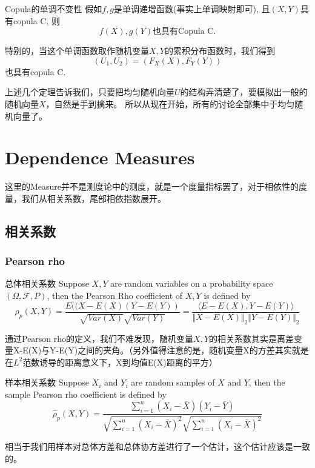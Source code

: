\documentclass[12pt]{article}
\theoremstyle{definition}
\newcommand{\inner}[2]{{\langle #1,#2\rangle}}
\newcommand{\Sum}[2]{{\sum_{#1}^{#2}}}
\begin{document}
\begin{stheorem}{Copula的单调不变性}{}
假如$f,g$是单调递增函数(事实上单调映射即可), 且$(X,Y)$具有copula C, 则
$$
f(X), g(Y) \text{也具有Copula C}.
$$
\end{stheorem}
\begin{sremark}{}{}
特别的，当这个单调函数取作随机变量$X,Y$的累积分布函数时，我们得到
$$
(U_1,U_2) = (F_X(X),F_Y(Y))
$$
也具有copula C.
\end{sremark}
上述几个定理告诉我们，只要把均匀随机向量$U$的结构弄清楚了，要模拟出一般的随机向量$X$，自然是手到擒来。
所以从现在开始，所有的讨论全部集中于均匀随机向量了。



\section{Dependence Measures}
这里的Measure并不是测度论中的测度，就是一个度量指标罢了，对于相依性的度量，我们从相关系数，尾部相依指数展开。
\subsection{相关系数}
\subsubsection{Pearson rho}
\begin{sdefinition}{总体相关系数}{}
Suppose $X,Y$ are random variables on a probability space $(\Omega,\mathcal{F},P)$, then the Pearson Rho coefficient of $X,Y$ is defined by 
$$
\rho_p(X,Y) = \frac{E((X-E(X)(Y-E(Y))}{\sqrt{Var(X)}\sqrt{Var(Y)}} = \frac{\inner{E-E(X)}{Y-E(Y)}}{\Vert X-E(X)\Vert_2 \Vert Y-E(Y) \Vert_2}
$$
\end{sdefinition}
\begin{sremark}{}{}
通过Pearson rho的定义，我们不难发现，随机变量$X,Y$的相关系数其实是离差变量X-E(X)与Y-E(Y)之间的夹角。（另外值得注意的是，随机变量X的方差其实就是在$L^2$范数诱导的距离意义下，X到均值E(X)距离的平方）
\end{sremark}

\begin{sdefinition}{样本相关系数}{}
Suppose $X_i$ and $Y_i$ are random samples of $X$ and $Y$, then the sample Pearson rho 
coefficient is defined by
$$
\hat \rho_p(X,Y) = \frac{\Sum{i=1}{n}(X_i -\bar X)(Y_i -\bar Y)}{\sqrt{\Sum{i=1}{n}(X_i-\bar X)^2}\sqrt{\Sum{i=1}{n}(X_i-\bar X)^2}}
$$
\end{sdefinition}
\begin{sremark}{}{}
	相当于我们用样本对总体方差和总体协方差进行了一个估计，这个估计应该是一致的。
\end{sremark}
\end{document}

